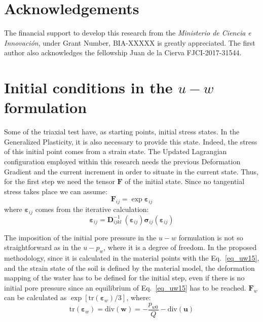 \documentclass[preprint,12pt,a4paper]{elsarticle}
\begin{document}
\section*{Acknowledgements}
The  financial support to develop this research from the \textit{Ministerio de Ciencia e Innovaci\'on}, under Grant Number, BIA-XXXXX is greatly appreciated. The first author also acknowledges the fellowship Juan de la Cierva FJCI-2017-31544.

\appendix

\clearpage
{}
\section{Initial conditions in the $u-w$ formulation}
\label{ap:1}
Some of the triaxial test have, as starting points, initial stress states. In the Generalized Plasticity, it is also necessary to provide this state. Indeed, the stress of this initial point comes from a strain state. The Updated Lagrangian configuration employed within this research needs the previous Deformation Gradient and the current increment in order to situate in the current state. Thus, for the first step we need the tensor $\boldsymbol{F}$ of the initial state. Since no tangential stress takes place we can assume:
\begin{equation}
    \boldsymbol{F}_{ij}=\exp{\boldsymbol{\varepsilon}_{ij}}
\end{equation}
where $\boldsymbol{\varepsilon}_{ij}$ comes from the iterative calculation:
\begin{equation}
    \boldsymbol{\varepsilon}_{ij}=\boldsymbol{D}^{-1}_{ijkl}\:(\boldsymbol{\varepsilon}_{ij})\boldsymbol{\sigma}_{ij}(\boldsymbol{\varepsilon}_{ij})
\end{equation}

The imposition of the initial pore pressure in the $u-w$ formulation is not so straightforward as in the $u-p_w$, where it is a degree of freedom. In the proposed methodology, since it is calculated in the material points with the Eq.~\eqref{eq_uw15}, and the strain state of the soil is defined by the material model, the deformation mapping of the water has to be defined for the initial step, even if there is no initial pore pressure since an equilibrium of Eq.~\eqref{eq_uw15} has to be reached. $\boldsymbol{F}_w$ can be calculated as $\exp{\left[\text{tr}\left(\boldsymbol{\varepsilon}_{w}\right)/3\right]}$, where:
\begin{equation}
  \text{tr}\left(\boldsymbol{\varepsilon}_{w}\right) = \mbox{div} (\boldsymbol{w}) = -\frac{p_{w0}}{Q} - \mbox{div} (\boldsymbol{u})
\end{equation}
\end{document}
